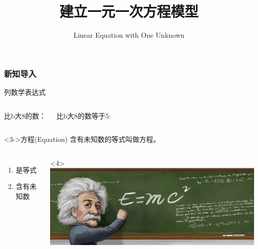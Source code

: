 

\usepackage{array}

\title{建立一元一次方程模型}
\subtitle{Linear Equation with One Unknown}

\frame{\titlepage}

\begin{frame}[t]
    \frametitle{新知导入}
    \begin{block}{列数学表达式}
        \begin{columns}
            比b大8的数：

            比b大8的数等于5: 
        \end{columns}
    \end{block}
        \begin{alertblock}<3->{方程(Equation)}
            含有未知数的等式叫做方程。
        \end{alertblock}

        \begin{columns}
            \begin{enumerate}
                \item<3-> 是等式
                \item<3-> 含有未知数
            \end{enumerate}
            <4>
                \includegraphics[width=.99\textwidth]{assets/equation of albert.jpg}
            \parbox{.75\textwidth}{}
        \end{columns}
\end{frame}

